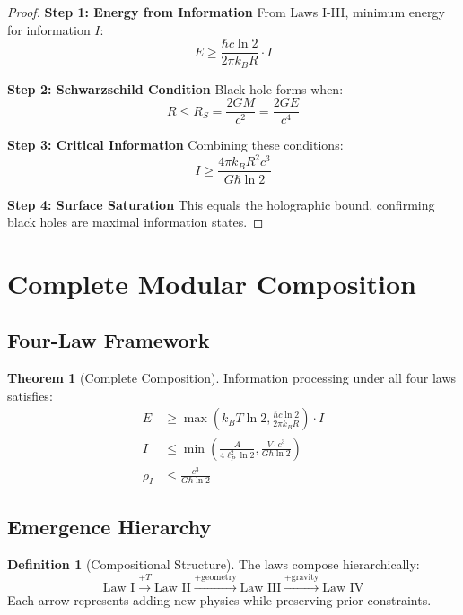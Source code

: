 \documentclass[11pt,a4paper]{article}
\theoremstyle{definition}
\newtheorem{definition}{Definition}[section]
\newtheorem{theorem}{Theorem}[section]
\begin{document}
\begin{proof}
\textbf{Step 1: Energy from Information}
From Laws I-III, minimum energy for information $I$:
\begin{equation}
E \geq \frac{\hbar c \ln 2}{2\pi k_B R} \cdot I
\end{equation}

\textbf{Step 2: Schwarzschild Condition}
Black hole forms when:
\begin{equation}
R \leq R_S = \frac{2GM}{c^2} = \frac{2GE}{c^4}
\end{equation}

\textbf{Step 3: Critical Information}
Combining these conditions:
\begin{equation}
I \geq \frac{4\pi k_B R^2 c^3}{G\hbar \ln 2}
\end{equation}

\textbf{Step 4: Surface Saturation}
This equals the holographic bound, confirming black holes are maximal information states.
\end{proof}

\section{Complete Modular Composition}

\subsection{Four-Law Framework}

\begin{theorem}[Complete Composition]
Information processing under all four laws satisfies:
\begin{align}
E &\geq \max\left(k_B T \ln 2, \frac{\hbar c \ln 2}{2\pi k_B R}\right) \cdot I \\
I &\leq \min\left(\frac{A}{4\ell_P^2 \ln 2}, \frac{V \cdot c^3}{G\hbar \ln 2}\right) \\
\rho_I &\leq \frac{c^3}{G\hbar \ln 2}
\end{align}
\end{theorem}

\subsection{Emergence Hierarchy}

\begin{definition}[Compositional Structure]
The laws compose hierarchically:
\begin{equation}
\text{Law I} \xrightarrow{+T} \text{Law II} \xrightarrow{+\text{geometry}} \text{Law III} \xrightarrow{+\text{gravity}} \text{Law IV}
\end{equation}
Each arrow represents adding new physics while preserving prior constraints.
\end{definition}
\end{document}
